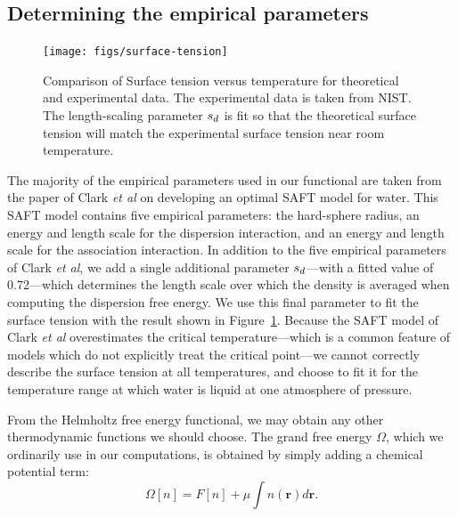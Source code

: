 \documentclass[letterpaper,twocolumn,amsmath,amssymb,prb]{revtex4-1}
\newcommand{\xx}{\textbf{r}}
\begin{document}
\subsection{Determining the empirical parameters}\label{sec:empirical}

\begin{figure}
\begin{center}
\texttt{[image: figs/surface-tension]}
\end{center}
\caption{Comparison of Surface tension versus temperature for theoretical and
  experimental data. The experimental data is taken from NIST.\cite{nistwater}
  The length-scaling parameter $s_d$ is fit so that the theoretical surface 
  tension will match the experimental surface tension near room temperature.}
\label{fig:surface-tension}
\end{figure}

The majority of the empirical parameters used in our functional are
taken from the paper of Clark \emph{et al} on developing an optimal
SAFT model for water\cite{clark2006developing}.  This SAFT model
contains five empirical parameters: the hard-sphere radius, an energy
and length scale for the dispersion interaction, and an energy and
length scale for the association interaction.  In addition to the five
empirical parameters of Clark \emph{et al}, we add a single additional
parameter $s_d$---with a fitted value of 0.72---which determines
the length scale over which the density is averaged when computing the
dispersion free energy.  We use this final parameter to fit the
surface tension with the result shown in
Figure~\ref{fig:surface-tension}.  Because the SAFT model of Clark
\emph{et al} overestimates the critical temperature---which is a
common feature of models which do not explicitly treat the critical
point---we cannot correctly describe the surface tension at all
temperatures, and choose to fit it for the temperature range at which
water is liquid at one atmosphere of pressure.

From the Helmholtz free energy functional, we may obtain any other
thermodynamic functions we should choose.  The grand free energy
$\Omega$, which we ordinarily use in our computations, is obtained by
simply adding a chemical potential term:
\begin{equation}
  \Omega[n] = F[n] + \mu \int n(\xx) d\xx.
\end{equation}
\end{document}
